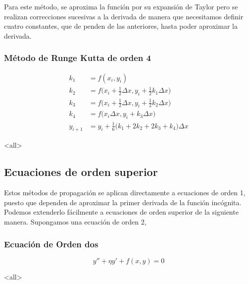 Para este método, se aproxima la función por su expansión de Taylor pero se
realizan correcciones sucesivas a la derivada de manera que necesitamos definir
cuatro constantes, que de penden de las anteriores, hasta poder aproximar la
derivada. 
\mode*
\begin{frame}[label=FrameMethodRungeKutta]
  \frametitle<presentation>{Método de Runge Kutta de orden 4}
\begin{equation}
  \begin{aligned}
    k_1 &= f(x_i, y_i)\\
    k_2 &= f \Big( x_i + \frac{1}{2} \Delta x, y_i + \frac{1}{2} k_1 \Delta x \Big)\\
    k_3 &= f \Big( x_i + \frac{1}{2} \Delta x, y_i + \frac{1}{2} k_2 \Delta x \Big)\\
    k_4 &= f \Big( x_i \Delta x, y_i + k_3 \Delta x \Big)\\
    y_{i+1} &= y_i+\frac{1}{6} \Big( k_1 + 2 k_2 + 2 k_3 + k_4 \Big) \Delta x
  \end{aligned}
\end{equation}
\end{frame}
\mode<all>

\subsection{Ecuaciones de orden superior}

Estos métodos de propagación se aplican directamente a ecuaciones de orden 1,
puesto que dependen de aproximar la primer derivada de la función incógnita. 
Podemos extenderlo fácilmente a ecuaciones de orden superior de la siguiente manera.
Supongamos una ecuación de orden 2, 
\mode*
\begin{frame}[label=FrameEcuacionOrden2]
  \frametitle<presentation>{Ecuación de Orden dos}
  \begin{equation}
    y'' + \eta y' + f(x, y) = 0
  \end{equation}
\end{frame}
\mode<all>

